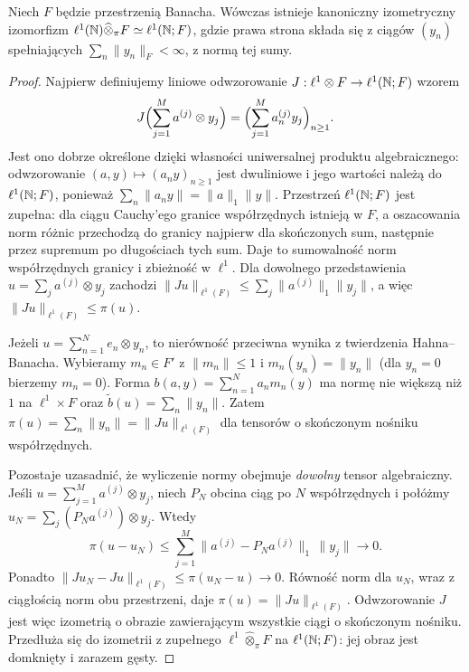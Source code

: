 \begin{twierdzenie}
\label{thm:l1-tensor24}
Niech $F$ będzie przestrzenią Banacha. Wówczas istnieje
kanoniczny izometryczny izomorfizm
$\ell^1(\mathbb N)\widehat\otimes_\pi F\simeq\ell^1(\mathbb N;F)$,
gdzie prawa strona składa się z ciągów $(y_n)$ spełniających
$\sum_n\|y_n\|_F<\infty$, z normą tej sumy.
\end{twierdzenie}
\begin{proof}
Najpierw definiujemy liniowe odwzorowanie
$J:\ell^1\otimes F\to\ell^1(\mathbb N;F)$ wzorem
\[
 J\Bigl(\sum_{j=1}^M a^{(j)}\otimes y_j\Bigr)
 =\Bigl(\sum_{j=1}^M a_n^{(j)}y_j\Bigr)_{n\ge1}.
\]
Jest ono dobrze określone dzięki własności uniwersalnej
produktu algebraicznego: odwzorowanie
$(a,y)\mapsto(a_ny)_{n\ge1}$ jest dwuliniowe i jego
wartości należą do $\ell^1(\mathbb N;F)$, ponieważ
$\sum_n\|a_n y\|=\|a\|_1\|y\|$.
Przestrzeń $\ell^1(\mathbb N;F)$ jest zupełna: dla ciągu
Cauchy'ego granice współrzędnych istnieją w $F$,
a oszacowania norm różnic przechodzą do granicy
najpierw dla skończonych sum, następnie przez
supremum po długościach tych sum. Daje to
sumowalność norm współrzędnych granicy i zbieżność w $\ell^1$.
Dla dowolnego przedstawienia
$u=\sum_j a^{(j)}\otimes y_j$ zachodzi
$\|Ju\|_{\ell^1(F)}\le\sum_j\|a^{(j)}\|_1\|y_j\|$,
a więc $\|Ju\|_{\ell^1(F)}\le\pi(u)$.

Jeżeli $u=\sum_{n=1}^N e_n\otimes y_n$, to nierówność
przeciwna wynika z twierdzenia Hahna--Banacha.
Wybieramy $m_n\in F'$ z $\|m_n\|\le1$ i
$m_n(y_n)=\|y_n\|$ (dla $y_n=0$ bierzemy $m_n=0$).
Forma $b(a,y)=\sum_{n=1}^Na_nm_n(y)$ ma normę
nie większą niż $1$ na $\ell^1\times F$ oraz
$\widetilde b(u)=\sum_n\|y_n\|$. Zatem
$\pi(u)=\sum_n\|y_n\|=\|Ju\|_{\ell^1(F)}$
dla tensorów o skończonym nośniku współrzędnych.

Pozostaje uzasadnić, że wyliczenie normy obejmuje
\emph{dowolny} tensor algebraiczny. Jeśli
$u=\sum_{j=1}^M a^{(j)}\otimes y_j$, niech $P_N$
obcina ciąg po $N$ współrzędnych i połóżmy
$u_N=\sum_j(P_Na^{(j)})\otimes y_j$. Wtedy
\[
 \pi(u-u_N)\le\sum_{j=1}^M
 \|a^{(j)}-P_Na^{(j)}\|_1\,\|y_j\|\longrightarrow0.
\]
Ponadto $\|Ju_N-Ju\|_{\ell^1(F)}\le\pi(u_N-u)\to0$. Równość
norm dla $u_N$, wraz z ciągłością norm obu przestrzeni,
daje $\pi(u)=\|Ju\|_{\ell^1(F)}$.
Odwzorowanie $J$ jest więc izometrią o obrazie
zawierającym wszystkie ciągi o skończonym nośniku.
Przedłuża się do izometrii z zupełnego
$\ell^1\widehat\otimes_\pi F$ na $\ell^1(\mathbb N;F)$:
jej obraz jest domknięty i zarazem gęsty.
\end{proof}

